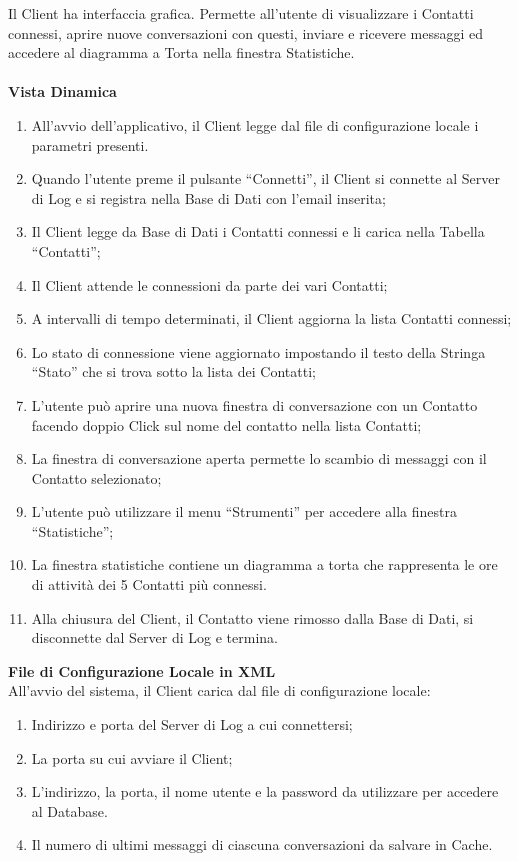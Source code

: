 \documentclass[a4paper, 11pt]{article} %
\begin{document}
Il Client ha interfaccia grafica. Permette all’utente di visualizzare i Contatti connessi, aprire nuove conversazioni con questi, inviare e ricevere messaggi ed accedere al diagramma a Torta nella finestra Statistiche.\\
\\
\textbf{Vista Dinamica}
\begin{enumerate}
\item All'avvio dell'applicativo, il Client legge dal file di configurazione locale i parametri presenti.
\item Quando l'utente preme il pulsante “Connetti”, il Client si connette al Server di Log e si registra nella Base di Dati con l'email inserita;
\item Il Client legge da Base di Dati i Contatti connessi e li carica nella Tabella “Contatti”;
\item Il Client attende le connessioni da parte dei vari Contatti;
\item A intervalli di tempo determinati, il Client aggiorna la lista Contatti connessi;
\item Lo stato di connessione viene aggiornato impostando il testo della Stringa “Stato” che si trova sotto la lista dei Contatti;
\item L'utente può aprire una nuova finestra di conversazione con un Contatto facendo doppio Click sul nome del contatto nella lista Contatti;
\item La finestra di conversazione aperta permette lo scambio di messaggi con il Contatto selezionato;
\item L'utente può utilizzare il menu “Strumenti” per accedere alla finestra “Statistiche”;
\item La finestra statistiche contiene un diagramma a torta che rappresenta le ore di attività dei 5 Contatti più connessi.
\item Alla chiusura del Client, il Contatto viene rimosso dalla Base di Dati, si disconnette dal Server di Log e termina.
\end{enumerate}
\vspace{0.5cm}
\textbf{File di Configurazione Locale in XML}\\
All'avvio del sistema, il Client carica dal file di configurazione locale:
\begin{enumerate}
\item Indirizzo e porta del Server di Log a cui connettersi;
\item La porta su cui avviare il Client;
\item L'indirizzo, la porta, il nome utente e la password da utilizzare per accedere al Database.
\item Il numero di ultimi messaggi di ciascuna conversazioni da salvare in Cache.
\end{enumerate}
\end{document}

